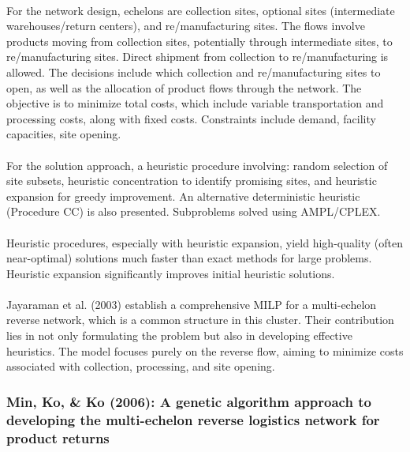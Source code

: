 \paragraph{} For the network design, echelons are collection sites, optional sites (intermediate warehouses/return centers), and re/manufacturing sites. The flows involve products moving from collection sites, potentially through intermediate sites, to re/manufacturing sites. Direct shipment from collection to re/manufacturing is allowed. The decisions include which collection and re/manufacturing sites to open, as well as the allocation of product flows through the network. The objective is to minimize total costs, which include variable transportation and processing costs, along with fixed costs. Constraints include demand, facility capacities, site opening.

\paragraph{} For the solution approach, a heuristic procedure involving: random selection of site subsets, heuristic concentration to identify promising sites, and heuristic expansion for greedy improvement. An alternative deterministic heuristic (Procedure CC) is also presented. Subproblems solved using AMPL/CPLEX.

\paragraph{} Heuristic procedures, especially with heuristic expansion, yield high-quality (often near-optimal) solutions much faster than exact methods for large problems. Heuristic expansion significantly improves initial heuristic solutions.

\paragraph{} Jayaraman et al. (2003) establish a comprehensive MILP for a multi-echelon reverse network, which is a common structure in this cluster. Their contribution lies in not only formulating the problem but also in developing effective heuristics. The model focuses purely on the reverse flow, aiming to minimize costs associated with collection, processing, and site opening.

\subsubsection{Min, Ko, \& Ko (2006): A genetic algorithm approach to developing the multi-echelon reverse logistics network for product returns}

